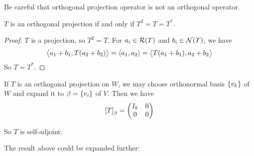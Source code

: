 Be careful that orthogonal projection operator is not an orthogonal operator.


\begin{theorem}
    $T$ is an orthogonal projection if and only if $T^2 = T = T^*$.
\end{theorem}
\begin{proof}
    $T$ is a projection, so $T^2 = T$. For $a_i \in \mathcal{R}(T)$ and $b_i \in \mathcal{N}(T)$, we have 
    \begin{equation*}
        \left\langle \displaystyle a_1 + b_1, T(a_2 + b_2) \right\rangle = \left\langle \displaystyle a_1, a_2 \right\rangle = \left\langle \displaystyle T(a_1 + b_1), a_2 + b_2 \right\rangle
    \end{equation*}
    So $T = T^*$.
\end{proof}

If $T$ is an orthogonal projection on $W$, we may choose orthonormal basis $\set{v_k}$ of $W$ and expand it to $\beta = \set{v_i}$ of $V$. Then we have
\begin{equation}
    \coordinate{T}_\beta = \begin{pmatrix}
        I_k & 0 \\
        0 & 0
    \end{pmatrix}
\end{equation}

So $T$ is self-adjoint.

The result above could be expanded further:

